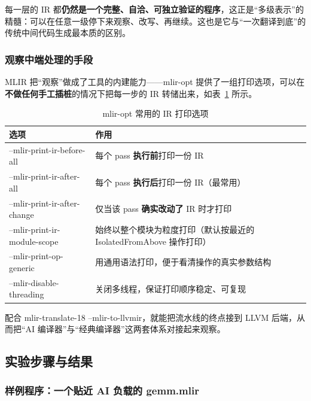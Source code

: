 \documentclass[UTF8,a4paper,10pt]{ctexart}
\newcommand{\headcol}{\bfseries}
\begin{document}
每一层的 IR 都\textbf{仍然是一个完整、自洽、可独立验证的程序}，这正是“多级表示”的精髓：可以在任意一级停下来观察、改写、再继续。这也是它与“一次翻译到底”的传统中间代码生成最本质的区别。

\subsubsection{观察中端处理的手段}

MLIR 把“观察”做成了工具的内建能力——mlir-opt 提供了一组打印选项，可以在\textbf{不做任何手工插桩}的情况下把每一步的 IR 转储出来，如表~\ref{tab:mliroptions} 所示。

\begin{table}[H]
  \centering
  \small
  \setlength{\tabcolsep}{4pt}
  \begin{tabular}{>{\centering\arraybackslash}p{4.8cm}>{\centering\arraybackslash}p{9.8cm}}
    \toprule
\headcol 选项 & \headcol 作用 \\
    \midrule
--mlir-print-ir-before-all & 每个 pass \textbf{执行前}打印一份 IR \\
    --mlir-print-ir-after-all & 每个 pass \textbf{执行后}打印一份 IR（最常用） \\
    --mlir-print-ir-after-change & 仅当该 pass \textbf{确实改动了} IR 时才打印 \\
    --mlir-print-ir-module-scope & 始终以整个模块为粒度打印（默认按最近的 IsolatedFromAbove 操作打印） \\
    --mlir-print-op-generic & 用通用语法打印，便于看清操作的真实参数结构 \\
    --mlir-disable-threading & 关闭多线程，保证打印顺序稳定、可复现 \\
    \bottomrule
\end{tabular}
  \caption{mlir-opt 常用的 IR 打印选项}
  \label{tab:mliroptions}
\end{table}

配合 mlir-translate-18 --mlir-to-llvmir，就能把流水线的终点接到 LLVM 后端，从而把“AI 编译器”与“经典编译器”这两套体系对接起来观察。

\subsection{实验步骤与结果}

\subsubsection{样例程序：一个贴近 AI 负载的 gemm.mlir}
\end{document}
